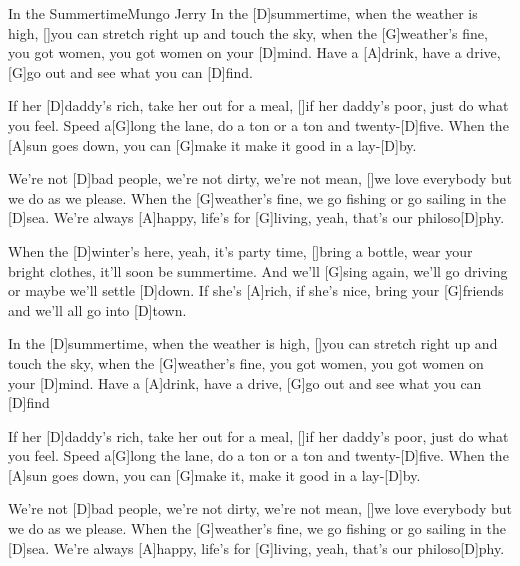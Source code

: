 \documentclass[../main.tex]{subfiles}
\begin{document}
\begin{song}{In the Summertime}{Mungo Jerry}{}
In the [D]summertime, when the weather is high,
[]you can stretch right up and touch the sky,
when the [G]weather's fine, you got women, you got women on your [D]mind.
Have a [A]drink, have a drive,
[G]go out and see what you can [D]find.

If her [D]daddy's rich, take her out for a meal,
[]if her daddy's poor, just do what you feel.
Speed a[G]long the lane, do a ton or a ton and twenty-[D]five.
When the [A]sun goes down,
you can [G]make it make it good in a lay-[D]by.

We're not [D]bad people, we're not dirty, we're not mean,
[]we love everybody but we do as we please.
When the [G]weather's fine, we go fishing or go sailing in the [D]sea.
We're always [A]happy,
life's for [G]living, yeah, that's our philoso[D]phy.

When the [D]winter's here, yeah, it's party time,
[]bring a bottle, wear your bright clothes, it'll soon be summertime.
And we'll [G]sing again, we'll go driving or maybe we'll settle [D]down.
If she's [A]rich, if she's nice,
bring your [G]friends and we'll all go into [D]town.

In the [D]summertime, when the weather is high,
[]you can stretch right up and touch the sky,
when the [G]weather's fine, you got women, you got women on your [D]mind.
Have a [A]drink, have a drive,
[G]go out and see what you can [D]find

If her [D]daddy's rich, take her out for a meal,
[]if her daddy's poor, just do what you feel.
Speed a[G]long the lane, do a ton or a ton and twenty-[D]five.
When the [A]sun goes down,
you can [G]make it, make it good in a lay-[D]by.

We're not [D]bad people, we're not dirty, we're not mean,
[]we love everybody but we do as we please.
When the [G]weather's fine, we go fishing or go sailing in the [D]sea.
We're always [A]happy,
life's for [G]living, yeah, that's our philoso[D]phy.
\end{song}
\end{document}
